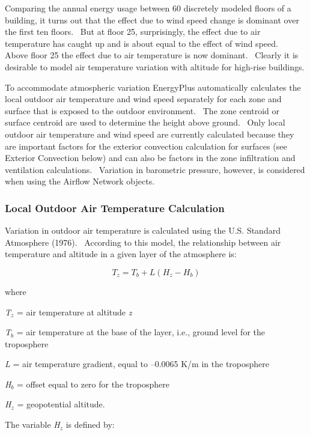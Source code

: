 Comparing the annual energy usage between 60 discretely modeled floors of a building, it turns out that the effect due to wind speed change is dominant over the first ten floors.~ But at floor 25, surprisingly, the effect due to air temperature has caught up and is about equal to the effect of wind speed.~ Above floor 25 the effect due to air temperature is now dominant.~ Clearly it is desirable to model air temperature variation with altitude for high-rise buildings.

To accommodate atmospheric variation EnergyPlus automatically calculates the local outdoor air temperature and wind speed separately for each zone and surface that is exposed to the outdoor environment.~ The zone centroid or surface centroid are used to determine the height above ground.~ Only local outdoor air temperature and wind speed are currently calculated because they are important factors for the exterior convection calculation for surfaces (see Exterior Convection below) and can also be factors in the zone infiltration and ventilation calculations.~ Variation in barometric pressure, however, is considered when using the Airflow Network objects.

\subsubsection{Local Outdoor Air Temperature Calculation}\label{local-outdoor-air-temperature-calculation}

Variation in outdoor air temperature is calculated using the U.S. Standard Atmosphere (1976).~ According to this model, the relationship between air temperature and altitude in a given layer of the atmosphere is:

\begin{equation}
{T_z} = {T_b} + L\left( {{H_z} - {H_b}} \right)
\end{equation}

where

\emph{T\(_{z}\)} = air temperature at altitude \emph{z}

\emph{T\(_{b}\)} = air temperature at the base of the layer, i.e., ground level for the troposphere

\emph{L} = air temperature gradient, equal to --0.0065 K/m in the troposphere

\emph{H\(_{b}\)} = offset equal to zero for the troposphere

\emph{H\(_{z}\)} = geopotential altitude.

The variable \emph{H\(_{z}\)} is defined by:

